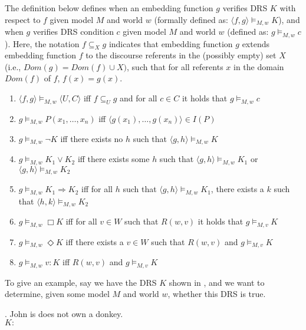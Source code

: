 The definition below defines when an embedding function $g$ verifies DRS $K$
with respect to $f$ given model $M$ and world $w$ (formally defined as: $\langle f,g\rangle
\vDash_{M,w} K$), and when $g$ verifies DRS condition $c$ given model $M$
and world $w$ (defined as: $g \vDash_{M,w} c$).  Here, the notation $f\subseteq_X g$
indicates that embedding function $g$ extends embedding function $f$ to the
discourse referents in the (possibly empty) set $X$ (i.e., $Dom(g) = Dom(f)
\cup X)$, such that for all referents $x$ in the domain $Dom(f)$ of $f$,
$f(x)=g(x)$. 

\begin{definition}\label{def:drtve}
  \begin{enumerate}
    \item $\langle f,g\rangle \vDash_{M,w} \langle U,C\rangle$ iff 
      $f\subseteq_U g$ and for all $c\in C$ it holds that $g \vDash_{M,w} c$
    \item $g \vDash_{M,w} P(x_1,\ldots,x_n)$ iff 
      $\langle g(x_1),\ldots,g(x_n)\rangle \in I(P)$
    \item $g \vDash_{M,w} \neg K$ iff there exists no $h$ such that 
      $\langle g,h \rangle \vDash_{M,w} K$
    \item $g \vDash_{M,w} K_1 \vee K_2$ iff there exists some $h$ such that 
      $\langle g,h \rangle \vDash_{M,w} K_1$ or $\langle g,h \rangle \vDash_{M,w} K_2$
    \item $g \vDash_{M,w} K_1 \Rightarrow K_2$ iff for all $h$ such that 
      $\langle g,h \rangle \vDash_{M,w} K_1$, there exists a $k$ such that 
      $\langle h,k \rangle \vDash_{M,w} K_2$
    \item $g \vDash_{M,w} \Box K$ iff for all $v\in W$ such that $R(w,v)$ 
      it holds that $g \vDash_{M,v} K$
    \item $g \vDash_{M,w} \Diamond K$ iff there exists a $v \in W$ such that
      $R(w,v)$ and $g \vDash_{M,v} K$
   \item $g \vDash_{M,w} v:K$ iff $R(w,v)$ and $g \vDash_{M,v} K$
  \end{enumerate}
\end{definition}

To give an example, say we have the DRS $K$ shown in \Next, and we want to
determine, given some model $M$ and world $w$, whether this DRS is true.

\ex. John is does not own a donkey.\\
      $K:$ 

